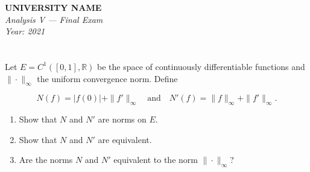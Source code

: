 \documentclass[12pt]{article}
\begin{document}
\begin{center}
  \Large\textbf{UNIVERSITY NAME} \\[1em]
  \large\textit{Analysis V — Final Exam} \\[0.5em]
  \large\textit{Year: 2021} \\[2em]
\end{center}

\vspace{0.5cm}

\section{}
Let \( E = C^1([0,1], \mathbb{R}) \) be the space of continuously differentiable functions and \(\|\cdot\|_\infty\) the uniform convergence norm. Define  

\[
N(f) = |f(0)| + \|f'\|_\infty \quad \text{and} \quad N'(f) = \|f\|_\infty + \|f'\|_\infty.
\]

\begin{enumerate}
    \item Show that \( N \) and \( N' \) are norms on \( E \).
    \item Show that \( N \) and \( N' \) are equivalent.
    \item Are the norms \( N \) and \( N' \) equivalent to the norm \(\|\cdot\|_\infty\)?
\end{enumerate}
\end{document}
